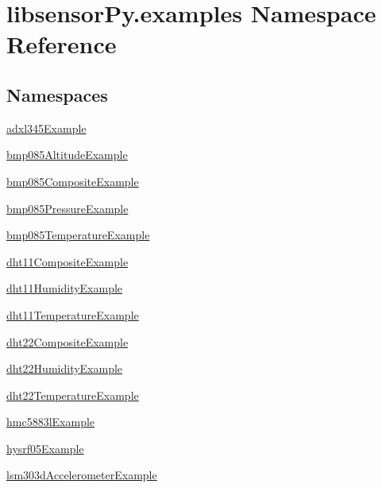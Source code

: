 \hypertarget{namespacelibsensorPy_1_1examples}{}\section{libsensor\+Py.\+examples Namespace Reference}
\label{namespacelibsensorPy_1_1examples}
\subsection*{Namespaces}
\begin{DoxyCompactItemize}
\item 
 \hyperlink{namespacelibsensorPy_1_1examples_1_1adxl345Example}{adxl345\+Example}
\item 
 \hyperlink{namespacelibsensorPy_1_1examples_1_1bmp085AltitudeExample}{bmp085\+Altitude\+Example}
\item 
 \hyperlink{namespacelibsensorPy_1_1examples_1_1bmp085CompositeExample}{bmp085\+Composite\+Example}
\item 
 \hyperlink{namespacelibsensorPy_1_1examples_1_1bmp085PressureExample}{bmp085\+Pressure\+Example}
\item 
 \hyperlink{namespacelibsensorPy_1_1examples_1_1bmp085TemperatureExample}{bmp085\+Temperature\+Example}
\item 
 \hyperlink{namespacelibsensorPy_1_1examples_1_1dht11CompositeExample}{dht11\+Composite\+Example}
\item 
 \hyperlink{namespacelibsensorPy_1_1examples_1_1dht11HumidityExample}{dht11\+Humidity\+Example}
\item 
 \hyperlink{namespacelibsensorPy_1_1examples_1_1dht11TemperatureExample}{dht11\+Temperature\+Example}
\item 
 \hyperlink{namespacelibsensorPy_1_1examples_1_1dht22CompositeExample}{dht22\+Composite\+Example}
\item 
 \hyperlink{namespacelibsensorPy_1_1examples_1_1dht22HumidityExample}{dht22\+Humidity\+Example}
\item 
 \hyperlink{namespacelibsensorPy_1_1examples_1_1dht22TemperatureExample}{dht22\+Temperature\+Example}
\item 
 \hyperlink{namespacelibsensorPy_1_1examples_1_1hmc5883lExample}{hmc5883l\+Example}
\item 
 \hyperlink{namespacelibsensorPy_1_1examples_1_1hysrf05Example}{hysrf05\+Example}
\item 
 \hyperlink{namespacelibsensorPy_1_1examples_1_1lsm303dAccelerometerExample}{lsm303d\+Accelerometer\+Example}

\end{DoxyCompactItemize}
